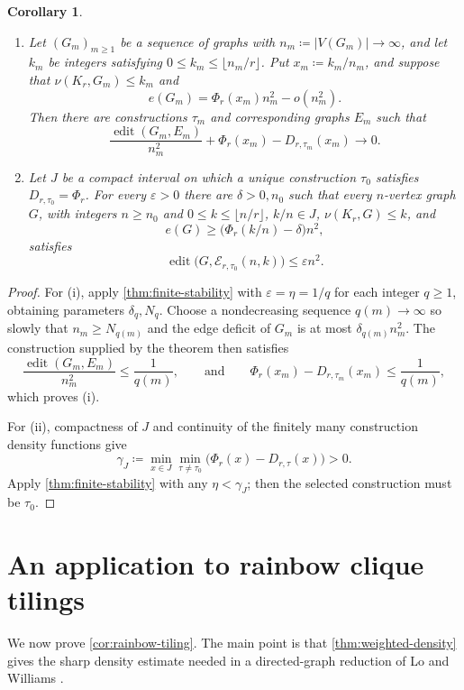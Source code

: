 \documentclass[10pt]{article}
\numberwithin{equation}{section}
\newtheorem{corollary}[corollary]{Corollary}
\newcommand{\edit}{\operatorname{edit}}
\newcommand{\cE}{\mathcal E}
\newcommand{\eps}{\varepsilon}
\begin{document}
\begin{corollary}\label{cor:stability-forms}
\begin{enumerate}[label=\textup{(\roman*)}]
\item Let $(G_m)_{m\ge1}$ be a sequence of graphs with $n_m\coloneqq|V(G_m)|\to\infty$, and let $k_m$ be integers satisfying $0\le k_m\le\lfloor n_m/r\rfloor$.  Put $x_m\coloneqq k_m/n_m$, and suppose that $\nu(K_r,G_m)\le k_m$ and
\[
 e(G_m)=\Phi_r(x_m)n_m^2-o(n_m^2).
\]
Then there are constructions $\tau_m$ and corresponding graphs $E_m$ such that
\[
 \frac{\edit(G_m,E_m)}{n_m^2}
 +\Phi_r(x_m)-D_{r,\tau_m}(x_m)
 \longrightarrow0.
\]
\item Let $J$ be a compact interval on which a unique construction $\tau_0$ satisfies $D_{r,\tau_0}=\Phi_r$.  For every $\eps>0$ there are $\delta>0,n_0$ such that every $n$-vertex graph $G$, with integers $n\ge n_0$ and $0\le k\le\lfloor n/r\rfloor$, $k/n\in J$, $\nu(K_r,G)\le k$, and
\[
 e(G)\ge\bigl(\Phi_r(k/n)-\delta\bigr)n^2,
\]
satisfies
\[
 \edit\bigl(G,\cE_{r,\tau_0}(n,k)\bigr)\le\eps n^2.
\]
\end{enumerate}
\end{corollary}

\begin{proof}
For \textup{(i)}, apply \cref{thm:finite-stability} with $\eps=\eta=1/q$ for each integer $q\ge1$, obtaining parameters $\delta_q,N_q$.  Choose a nondecreasing sequence $q(m)\to\infty$ so slowly that $n_m\ge N_{q(m)}$ and the edge deficit of $G_m$ is at most $\delta_{q(m)}n_m^2$.  The construction supplied by the theorem then satisfies
\[
 \frac{\edit(G_m,E_m)}{n_m^2}\le\frac1{q(m)},
 \qquad\text{and}\qquad
 \Phi_r(x_m)-D_{r,\tau_m}(x_m)\le\frac1{q(m)},
\]
which proves \textup{(i)}.

For \textup{(ii)}, compactness of $J$ and continuity of the finitely many construction density functions give
\[
 \gamma_J\coloneqq\min_{x\in J}\min_{\tau\ne\tau_0}
 \bigl(\Phi_r(x)-D_{r,\tau}(x)\bigr)>0.
\]
Apply \cref{thm:finite-stability} with any $\eta<\gamma_J$; then the selected construction must be $\tau_0$.
\end{proof}

\section{An application to rainbow clique tilings}\label{sec:rainbow}

We now prove \cref{cor:rainbow-tiling}.  The main point is that \cref{thm:weighted-density} gives the sharp density estimate needed in a directed-graph reduction of Lo and Williams \cite{LW24}.
\end{document}
